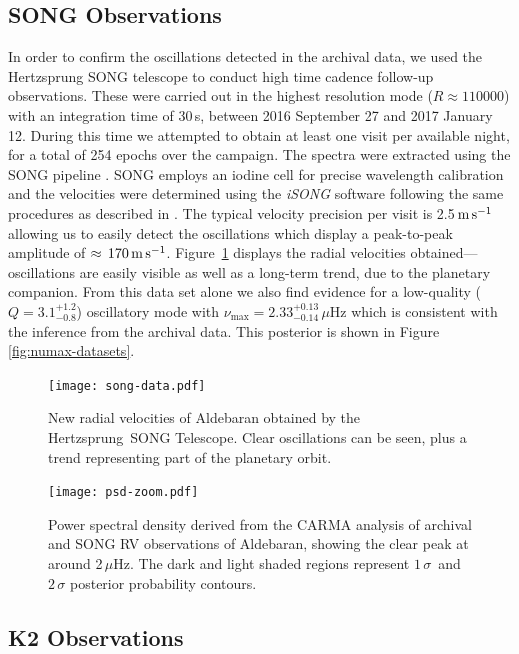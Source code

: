 \documentclass[modern]{aastex61}
\newcommand{\muHz}{\mbox{$\mu$Hz}\xspace}
\newcommand{\twosidedrange}[3]{\ensuremath{#1^{+#2}_{-#3}}}
\newcommand{\SONGQRange}{\twosidedrange{3.1}{1.2}{0.8}}
\newcommand{\SONGNuMaxRange}{\twosidedrange{2.33}{0.13}{0.14}}
\begin{document}
\subsection{SONG Observations}    %
\label{sec:SONG-observations} In order to confirm the oscillations detected in
the archival data, we used the Hertzsprung SONG telescope
\citep{2017ApJ...836..142G} to conduct high time cadence follow-up observations.
These were carried out in the highest resolution mode ($R\approx110000$) with an
integration time of 30\,s, between 2016 September 27 and 2017 January 12. During
this time we attempted to obtain at least one visit per available night, for a
total of 254 epochs over the campaign. The spectra were extracted using the SONG
pipeline \citep[see][]{2017ApJ...836..142G}. SONG employs an iodine cell for
precise wavelength calibration and the velocities were determined using the
\textit{iSONG} software following the same procedures as described in
\cite{2017ApJ...836..142G}. The typical velocity precision per visit is
2.5$\,\rm m\,s^{-1}$ allowing us to easily detect the oscillations which display
a peak-to-peak amplitude of $\approx \, 170 \, \rm m \, s^{-1}$.
Figure~\ref{songdata} displays the radial velocities obtained---oscillations
are easily visible as well as a long-term trend, due to the planetary companion.
From this data set alone we also find evidence for a low-quality ($Q =
\SONGQRange{}$) oscillatory mode with $\nu_\mathrm{max} = \SONGNuMaxRange{} \,
\mu\mathrm{Hz}$ which is consistent with the inference from the archival data.
This posterior is shown in Figure \ref{fig:numax-datasets}.


\begin{figure}
\centering
\texttt{[image: song-data.pdf]}
\caption{New radial velocities of Aldebaran obtained by the Hertzsprung~SONG Telescope. Clear oscillations can be seen, plus a trend representing part of the planetary orbit.}
\label{songdata}
\end{figure}


\begin{figure}
\centering
\texttt{[image: psd-zoom.pdf]}
%
\caption{Power spectral density derived from the CARMA analysis of archival and
SONG RV observations of Aldebaran, showing the clear peak at around 2\,\muHz.
The dark and light shaded regions represent $1\,\sigma$~and $2\,\sigma$
posterior probability contours. }
%
\label{psd}
\end{figure}


\subsection{K2 Observations}
\end{document}
